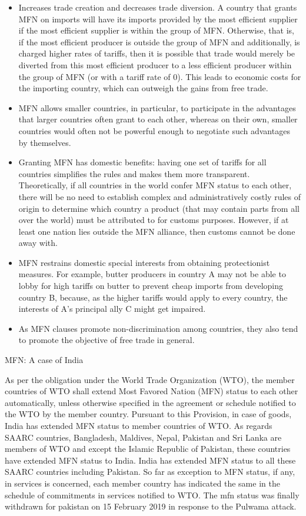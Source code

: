 \documentclass[
  openany]{book}
\providecommand{\tightlist}{%
  \setlength{\itemsep}{0pt}\setlength{\parskip}{0pt}}
\begin{document}
\begin{itemize}
\tightlist
\item
  Increases trade creation and decreases trade diversion. A country that grants MFN on imports will have its imports provided by the most efficient supplier if the most efficient supplier is within the group of MFN. Otherwise, that is, if the most efficient producer is outside the group of MFN and additionally, is charged higher rates of tariffs, then it is possible that trade would merely be diverted from this most efficient producer to a less efficient producer within the group of MFN (or with a tariff rate of 0). This leads to economic costs for the importing country, which can outweigh the gains from free trade.
\item
  MFN allows smaller countries, in particular, to participate in the advantages that larger countries often grant to each other, whereas on their own, smaller countries would often not be powerful enough to negotiate such advantages by themselves.
\item
  Granting MFN has domestic benefits: having one set of tariffs for all countries simplifies the rules and makes them more transparent. Theoretically, if all countries in the world confer MFN status to each other, there will be no need to establish complex and administratively costly rules of origin to determine which country a product (that may contain parts from all over the world) must be attributed to for customs purposes. However, if at least one nation lies outside the MFN alliance, then customs cannot be done away with.
\item
  MFN restrains domestic special interests from obtaining protectionist measures. For example, butter producers in country A may not be able to lobby for high tariffs on butter to prevent cheap imports from developing country B, because, as the higher tariffs would apply to every country, the interests of A's principal ally C might get impaired.
\item
  As MFN clauses promote non-discrimination among countries, they also tend to promote the objective of free trade in general.
\end{itemize}

MFN: A case of India

As per the obligation under the World Trade Organization (WTO), the member countries of WTO shall extend Most Favored Nation (MFN) status to each other automatically, unless otherwise specified in the agreement or schedule notified to the WTO by the member country. Pursuant to this Provision, in case of goods, India has extended MFN status to member countries of WTO. As regards SAARC countries, Bangladesh, Maldives, Nepal, Pakistan and Sri Lanka are members of WTO and except the Islamic Republic of Pakistan, these countries have extended MFN status to India. India has extended MFN status to all these SAARC countries including Pakistan. So far as exception to MFN status, if any, in services is concerned, each member country has indicated the same in the schedule of commitments in services notified to WTO. The mfn status was finally withdrawn for pakistan on 15 February 2019 in response to the Pulwama attack.
\end{document}
